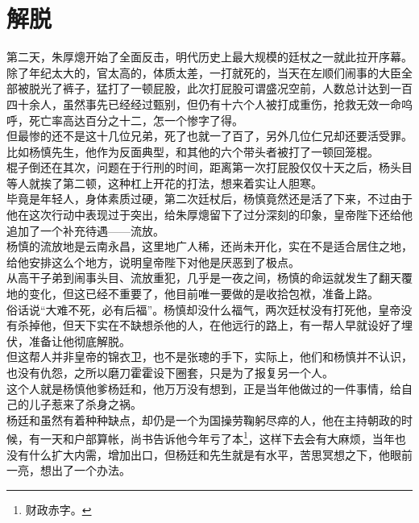 \section{解脱}
\ifnum{}
	\begin{multicols}{\theparacolNo}
\fi
第二天，朱厚熜开始了全面反击，明代历史上最大规模的廷杖之一就此拉开序幕。\\

除了年纪太大的，官太高的，体质太差，一打就死的，当天在左顺们闹事的大臣全部被脱光了裤子，猛打了一顿屁股，此次打屁股可谓盛况空前，人数总计达到一百四十余人，虽然事先已经经过甄别，但仍有十六个人被打成重伤，抢救无效一命呜呼，死亡率高达百分之十二，怎一个惨字了得。\\

但最惨的还不是这十几位兄弟，死了也就一了百了，另外几位仁兄却还要活受罪。比如杨慎先生，他作为反面典型，和其他的六个带头者被打了一顿回笼棍。\\

棍子倒还在其次，问题在于行刑的时间，距离第一次打屁股仅仅十天之后，杨头目等人就挨了第二顿，这种杠上开花的打法，想来着实让人胆寒。\\

毕竟是年轻人，身体素质过硬，第二次廷杖后，杨慎竟然还是活了下来，不过由于他在这次行动中表现过于突出，给朱厚熜留下了过分深刻的印象，皇帝陛下还给他追加了一个补充待遇——流放。\\

杨慎的流放地是云南永昌，这里地广人稀，还尚未开化，实在不是适合居住之地，给他安排这么个地方，说明皇帝陛下对他是厌恶到了极点。\\

从高干子弟到闹事头目、流放重犯，几乎是一夜之间，杨慎的命运就发生了翻天覆地的变化，但这已经不重要了，他目前唯一要做的是收拾包袱，准备上路。\\

俗话说“大难不死，必有后福”。杨慎却没什么福气，两次廷杖没有打死他，皇帝没有杀掉他，但天下实在不缺想杀他的人，在他远行的路上，有一帮人早就设好了埋伏，准备让他彻底解脱。\\

但这帮人并非皇帝的锦衣卫，也不是张璁的手下，实际上，他们和杨慎并不认识，也没有仇怨，之所以磨刀霍霍设下圈套，只是为了报复另一个人。\\

这个人就是杨慎他爹杨廷和，他万万没有想到，正是当年他做过的一件事情，给自己的儿子惹来了杀身之祸。\\

杨廷和虽然有着种种缺点，却仍是一个为国操劳鞠躬尽瘁的人，他在主持朝政的时候，有一天和户部算帐，尚书告诉他今年亏了本\footnote{财政赤字。}，这样下去会有大麻烦，当年也没有什么扩大内需，增加出口，但杨廷和先生就是有水平，苦思冥想之下，他眼前一亮，想出了一个办法。\\


\end{multicols}
